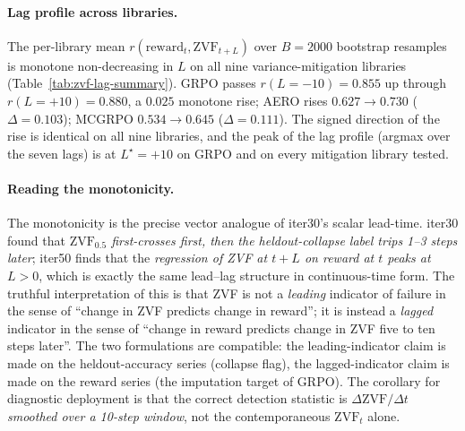 \documentclass{article}
\begin{document}
\paragraph{Lag profile across libraries.}
The per-library mean $r(\mathrm{reward}_t,\mathrm{ZVF}_{t+L})$ over
$B{=}2000$ bootstrap resamples is monotone non-decreasing in $L$ on
all nine variance-mitigation libraries (Table~\ref{tab:zvf-lag-summary}).
GRPO passes $r(L{=}{-}10){=}0.855$ up through $r(L{=}{+}10){=}0.880$,
a $0.025$ monotone rise; AERO rises $0.627 \rightarrow 0.730$
($\Delta{=}0.103$); MCGRPO $0.534 \rightarrow 0.645$
($\Delta{=}0.111$). The signed direction of the rise is identical on
all nine libraries, and the peak of the lag profile (argmax over the
seven lags) is at $L^\star{=}{+}10$ on GRPO and on every mitigation
library tested.

\paragraph{Reading the monotonicity.}
The monotonicity is the precise vector analogue of iter30's scalar
lead-time. iter30 found that
\emph{$\mathrm{ZVF}_{0.5}$ first-crosses first, then the
heldout-collapse label trips 1--3 steps later}; iter50 finds that the
\emph{regression of ZVF at $t{+}L$ on reward at $t$ peaks at $L{>}0$},
which is exactly the same lead--lag structure in continuous-time form.
The truthful interpretation of this is that ZVF is not a \emph{leading}
indicator of failure in the sense of ``change in ZVF predicts change
in reward''; it is instead a \emph{lagged} indicator in the sense of
``change in reward predicts change in ZVF five to ten steps later''.
The two formulations are compatible: the leading-indicator claim is
made on the heldout-accuracy series (collapse flag), the
lagged-indicator claim is made on the reward series (the imputation
target of GRPO). The corollary for diagnostic deployment is that the
correct detection statistic is
$\Delta\mathrm{ZVF}/\Delta t$ \emph{smoothed over a 10-step window},
not the contemporaneous $\mathrm{ZVF}_t$ alone.
\end{document}
